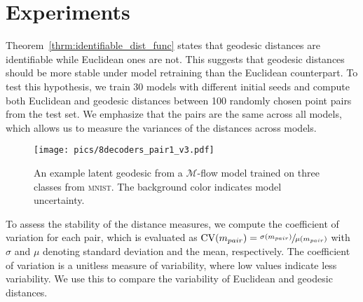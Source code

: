 \section{Experiments}
\label{sec:experiments}

Theorem~\ref{thrm:identifiable_dist_func} states that geodesic distances are identifiable while Euclidean ones are not. This suggests that geodesic distances should be more stable under model retraining than the Euclidean counterpart. To test this hypothesis, we train 30 models with different initial seeds and compute both Euclidean and geodesic distances between 100 randomly chosen point pairs from the test set. We emphasize that the pairs are the same across all models, which allows us to measure the variances of the distances across models.

\begin{SCfigure}[100][b]
    \texttt{[image: pics/8decoders\_pair1\_v3.pdf]}
    \caption{An example latent geodesic from a $\mathcal{M}$-flow model trained on three classes from \textsc{mnist}. The background color indicates model uncertainty.}
    \label{fig:godesic}
\end{SCfigure}


To assess the stability of the distance measures, we compute the coefficient of variation for each pair, which is evaluated as $\text{CV}(m_{pair}) = \sfrac{\sigma(m_{pair})}{\mu(m_{pair})}$ with $\sigma$ and $\mu$ denoting standard deviation and the mean, respectively. The coefficient of variation is a unitless measure of variability, where low values indicate less variability. We use this to compare the variability of Euclidean and geodesic distances.


